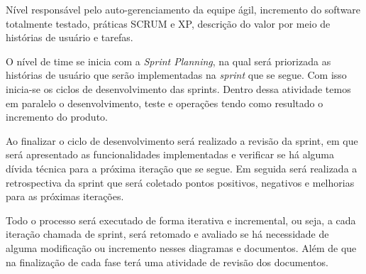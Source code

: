 Nível responsável pelo auto-gerenciamento da equipe ágil, incremento do software totalmente testado, práticas SCRUM e XP, descrição do valor por meio de histórias de usuário e tarefas.

O nível de time se inicia com a \textit{Sprint Planning}, na qual será priorizada as histórias de usuário que serão implementadas na \textit{sprint} que se segue. Com isso inicia-se os ciclos de desenvolvimento das sprints. Dentro dessa atividade temos em paralelo o desenvolvimento, teste e operações tendo como resultado o incremento do produto.

Ao finalizar o ciclo de desenvolvimento será realizado a revisão da sprint, em que será apresentado as funcionalidades implementadas e verificar se há alguma dívida técnica para a próxima iteração que se segue. Em seguida será realizada a retrospectiva da sprint que será coletado pontos positivos, negativos e melhorias para as próximas iterações.

Todo o processo será executado de forma iterativa e incremental, ou seja, a cada iteração chamada de sprint, será retomado e avaliado se há necessidade de alguma modificação ou incremento nesses diagramas e documentos. Além de que na finalização de cada fase terá uma atividade de revisão dos documentos.
